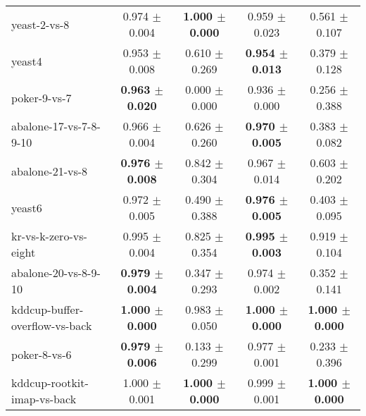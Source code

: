 \begin{table}[!ht]
{\begin{tabular}{l c c c c}
yeast-2-vs-8 & 0.974 $\pm$ 0.004 & \textbf{1.000 $\pm$ 0.000} & 0.959 $\pm$ 0.023 & 0.561 $\pm$ 0.107 \\
yeast4 & 0.953 $\pm$ 0.008 & 0.610 $\pm$ 0.269 & \textbf{0.954 $\pm$ 0.013} & 0.379 $\pm$ 0.128 \\
poker-9-vs-7 & \textbf{0.963 $\pm$ 0.020} & 0.000 $\pm$ 0.000 & 0.936 $\pm$ 0.000 & 0.256 $\pm$ 0.388 \\
abalone-17-vs-7-8-9-10 & 0.966 $\pm$ 0.004 & 0.626 $\pm$ 0.260 & \textbf{0.970 $\pm$ 0.005} & 0.383 $\pm$ 0.082 \\
abalone-21-vs-8 & \textbf{0.976 $\pm$ 0.008} & 0.842 $\pm$ 0.304 & 0.967 $\pm$ 0.014 & 0.603 $\pm$ 0.202 \\
yeast6 & 0.972 $\pm$ 0.005 & 0.490 $\pm$ 0.388 & \textbf{0.976 $\pm$ 0.005} & 0.403 $\pm$ 0.095 \\
kr-vs-k-zero-vs-eight & 0.995 $\pm$ 0.004 & 0.825 $\pm$ 0.354 & \textbf{0.995 $\pm$ 0.003} & 0.919 $\pm$ 0.104 \\
abalone-20-vs-8-9-10 & \textbf{0.979 $\pm$ 0.004} & 0.347 $\pm$ 0.293 & 0.974 $\pm$ 0.002 & 0.352 $\pm$ 0.141 \\
kddcup-buffer-overflow-vs-back & \textbf{1.000 $\pm$ 0.000} & 0.983 $\pm$ 0.050 & \textbf{1.000 $\pm$ 0.000} & \textbf{1.000 $\pm$ 0.000} \\
poker-8-vs-6 & \textbf{0.979 $\pm$ 0.006} & 0.133 $\pm$ 0.299 & 0.977 $\pm$ 0.001 & 0.233 $\pm$ 0.396 \\
kddcup-rootkit-imap-vs-back & 1.000 $\pm$ 0.001 & \textbf{1.000 $\pm$ 0.000} & 0.999 $\pm$ 0.001 & \textbf{1.000 $\pm$ 0.000} \\
\end{tabular}}
\end{table}
